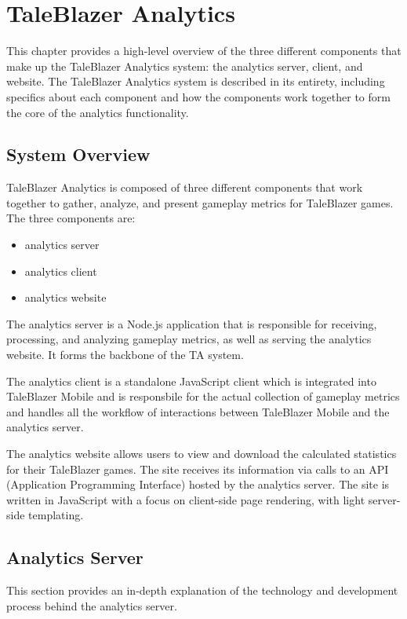 \chapter{TaleBlazer Analytics}

This chapter provides a high-level overview of the three different components that make up the TaleBlazer Analytics system: the analytics server, client, and website. The TaleBlazer Analytics system is described in its entirety, including specifics about each component and how the components work together to form the core of the analytics functionality. 

\section{System Overview} 

TaleBlazer Analytics is composed of three different components that work together to gather, analyze, and present gameplay metrics for TaleBlazer games. The three components are: 
	\begin{itemize}
		\item analytics server
		\item analytics client
		\item analytics website
	\end{itemize}

The analytics server is a Node.js application that is responsible for receiving, processing, and analyzing gameplay metrics, as well as serving the analytics website. It forms the backbone of the TA system. 

The analytics client is a standalone JavaScript client which is integrated into TaleBlazer Mobile and is responsbile for the actual collection of gameplay metrics and handles all the workflow of interactions between TaleBlazer Mobile and the analytics server. 

The analytics website allows users to view and download the calculated statistics for their TaleBlazer games. The site receives its information via calls to an API (Application Programming Interface) hosted by the analytics server. The site is written in JavaScript with a focus on client-side page rendering, with light server-side templating. 

\section{Analytics Server}

This section provides an in-depth explanation of the technology and development process behind the analytics server.

